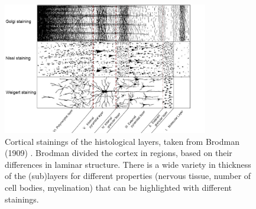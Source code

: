 \begin{figure}[!ht]
	\centering
	\includegraphics[width=0.8\textwidth, clip=true]{./Chapters/01_Introduction/Images/Layers}
	\caption{Cortical stainings of the histological layers, taken from Brodman (1909) \cite{Brodmann1909}. Brodman divided the cortex in regions, based on their differences in laminar structure. There is a wide variety in thickness of the (sub)layers for different properties (nervous tissue, number of cell bodies, myelination) that can be highlighted with different stainings.}
	\label{fig:layers}
\end{figure}